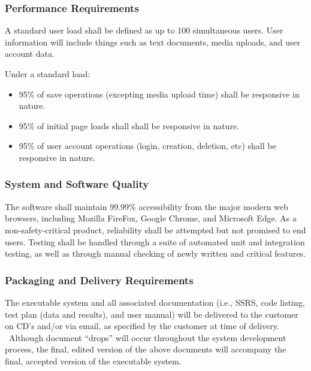 \documentclass[onecolumn, draftclsnofoot,10pt, compsoc]{IEEEtran}
\begin{document}
{\subsubsection[Performance Requirements]{Performance Requirements}

{\noindent
A standard user load shall be defined as up to 100 simultaneous users. User information
will include things such as text documents, media uploads, and user account data.

Under a standard load:
\begin{itemize}
  \item 95\% of save operations (excepting media upload time) shall be responsive in
  nature.
  \item 95\% of initial page loads shall shall be responsive in
  nature.
  \item 95\% of user account operations (login, creation, deletion, etc) shall be
  responsive in nature.
\end{itemize}}

\subsubsection[System and Software Quality]{System and Software Quality}

The software shall maintain 99.99\% accessibility from the major modern web browsers, including Mozilla FireFox,
Google Chrome, and Microsoft Edge.
As a non-safety-critical product, reliability shall be attempted but not promised
to end users. Testing shall be handled through a suite of automated unit and integration testing, as well as
through manual checking of newly written and critical features.

\subsubsection[Packaging and Delivery Requirements]{Packaging and Delivery Requirements}

{\noindent
The executable system and all associated documentation (i.e., SSRS,
code listing, test plan (data and results), and user manual) will be
delivered to the customer on CD{\textquoteright}s and/or via email, as
specified by the customer at time of delivery. \ Although document
{\textquotedblleft}drops{\textquotedblright} will occur throughout the
system development process, the final, edited version of the above
documents will accompany the final, accepted version of the executable
system.}

}
\end{document}

